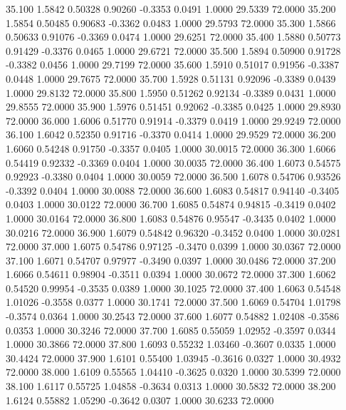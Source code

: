   35.100   1.5842   0.50328   0.90260  -0.3353   0.0491   1.0000  29.5339  72.0000
  35.200   1.5854   0.50485   0.90683  -0.3362   0.0483   1.0000  29.5793  72.0000
  35.300   1.5866   0.50633   0.91076  -0.3369   0.0474   1.0000  29.6251  72.0000
  35.400   1.5880   0.50773   0.91429  -0.3376   0.0465   1.0000  29.6721  72.0000
  35.500   1.5894   0.50900   0.91728  -0.3382   0.0456   1.0000  29.7199  72.0000
  35.600   1.5910   0.51017   0.91956  -0.3387   0.0448   1.0000  29.7675  72.0000
  35.700   1.5928   0.51131   0.92096  -0.3389   0.0439   1.0000  29.8132  72.0000
  35.800   1.5950   0.51262   0.92134  -0.3389   0.0431   1.0000  29.8555  72.0000
  35.900   1.5976   0.51451   0.92062  -0.3385   0.0425   1.0000  29.8930  72.0000
  36.000   1.6006   0.51770   0.91914  -0.3379   0.0419   1.0000  29.9249  72.0000
  36.100   1.6042   0.52350   0.91716  -0.3370   0.0414   1.0000  29.9529  72.0000
  36.200   1.6060   0.54248   0.91750  -0.3357   0.0405   1.0000  30.0015  72.0000
  36.300   1.6066   0.54419   0.92332  -0.3369   0.0404   1.0000  30.0035  72.0000
  36.400   1.6073   0.54575   0.92923  -0.3380   0.0404   1.0000  30.0059  72.0000
  36.500   1.6078   0.54706   0.93526  -0.3392   0.0404   1.0000  30.0088  72.0000
  36.600   1.6083   0.54817   0.94140  -0.3405   0.0403   1.0000  30.0122  72.0000
  36.700   1.6085   0.54874   0.94815  -0.3419   0.0402   1.0000  30.0164  72.0000
  36.800   1.6083   0.54876   0.95547  -0.3435   0.0402   1.0000  30.0216  72.0000
  36.900   1.6079   0.54842   0.96320  -0.3452   0.0400   1.0000  30.0281  72.0000
  37.000   1.6075   0.54786   0.97125  -0.3470   0.0399   1.0000  30.0367  72.0000
  37.100   1.6071   0.54707   0.97977  -0.3490   0.0397   1.0000  30.0486  72.0000
  37.200   1.6066   0.54611   0.98904  -0.3511   0.0394   1.0000  30.0672  72.0000
  37.300   1.6062   0.54520   0.99954  -0.3535   0.0389   1.0000  30.1025  72.0000
  37.400   1.6063   0.54548   1.01026  -0.3558   0.0377   1.0000  30.1741  72.0000
  37.500   1.6069   0.54704   1.01798  -0.3574   0.0364   1.0000  30.2543  72.0000
  37.600   1.6077   0.54882   1.02408  -0.3586   0.0353   1.0000  30.3246  72.0000
  37.700   1.6085   0.55059   1.02952  -0.3597   0.0344   1.0000  30.3866  72.0000
  37.800   1.6093   0.55232   1.03460  -0.3607   0.0335   1.0000  30.4424  72.0000
  37.900   1.6101   0.55400   1.03945  -0.3616   0.0327   1.0000  30.4932  72.0000
  38.000   1.6109   0.55565   1.04410  -0.3625   0.0320   1.0000  30.5399  72.0000
  38.100   1.6117   0.55725   1.04858  -0.3634   0.0313   1.0000  30.5832  72.0000
  38.200   1.6124   0.55882   1.05290  -0.3642   0.0307   1.0000  30.6233  72.0000
